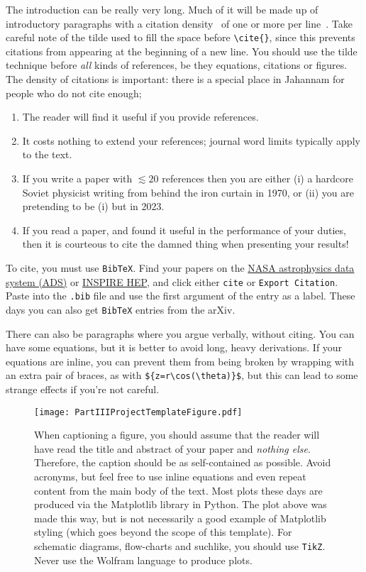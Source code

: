 \documentclass[aps,prd,reprint,preprintnumbers,showpacs,floatfix,nofootinbib,superscript address]{revtex4-2}
\begin{document}
The introduction can be really very long. Much of it will be made up of introductory paragraphs with a citation density~\cite{Heisenberg:2020xak} of one or more per line~\cite{PhysRevD.28.286,Shaposhnikov:2020aen}. Take careful note of the tilde used to fill the space before \texttt{\textbackslash cite\{\}}, since this prevents citations from appearing at the beginning of a new line. You should use the tilde technique before \emph{all} kinds of references, be they equations, citations or figures. The density of citations is important: there is a special place in Jahannam for people who do not cite enough;
\begin{enumerate}
\item The reader will find it useful if you provide references.
\item It costs nothing to extend your references; journal word limits typically apply to the text. 
\item If you write a paper with $\lesssim 20$ references then you are either (i) a hardcore Soviet physicist writing from behind the iron curtain in 1970, or (ii) you are pretending to be (i) but in 2023.
\item If you read a paper, and found it useful in the performance of your duties, then it is courteous to cite the damned thing when presenting your results!
\end{enumerate}
To cite, you must use \texttt{BibTeX}. Find your papers on the \href{https://ui.adsabs.harvard.edu/}{NASA astrophysics data system (ADS)} or \href{https://inspirehep.net/}{INSPIRE HEP}, and click either \texttt{cite} or \texttt{Export Citation}. Paste into the \texttt{.bib} file and use the first argument of the entry as a label. These days you can also get \texttt{BibTeX} entries from the arXiv.

There can also be paragraphs where you argue verbally, without citing. You can have some equations, but it is better to avoid long, heavy derivations. If your equations are inline, you can prevent them from being broken by wrapping with an extra pair of braces, as with \texttt{\$\{z=r\textbackslash cos(\textbackslash theta)\}\$}, but this can lead to some strange effects if you're not careful.

\begin{figure}[t!]
  \center
  \texttt{[image: PartIIIProjectTemplateFigure.pdf]}
	\caption{\label{PartIIIProjectTemplateFigure} 
	When captioning a figure, you should assume that the reader will have read the title and abstract of your paper and \textit{nothing else}. Therefore, the caption should be as self-contained as possible. Avoid acronyms, but feel free to use inline equations and even repeat content from the main body of the text. Most plots these days are produced via the Matplotlib library in Python. The plot above was made this way, but is not necessarily a good example of Matplotlib styling (which goes beyond the scope of this template). For schematic diagrams, flow-charts and suchlike, you should use \texttt{TikZ}. Never use the Wolfram language to produce plots.
	}
\end{figure}
\end{document}
